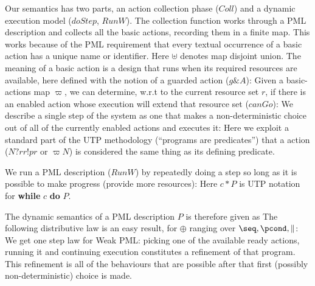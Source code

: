 Our semantics has two parts, an action collection phase ($Coll$)
and a dynamic execution model ($doStep$, $RunW$).
The collection function works through a PML description
and collects all the basic actions,
recording them in a finite map.
This works because of the PML requirement
that every textual occurrence
of a basic action has a unique name or identifier.
Here $\uplus$ denotes map disjoint union.
The meaning of a basic action is a design that runs when its
required resources are available,
here defined with the notion of a guarded action ($g\&A$):
Given a basic-actions map $\varpi$,
we can determine, w.r.t to the current resource set $r$,
if there is an enabled action whose execution will extend that
resource set ($canGo$):
We describe a single step of the system as one that
makes a non-deterministic choice out of all of the currently
enabled actions
and executes it:
Here we exploit a standard part of the UTP methodology
 (``programs are predicates'')
that a action ($N?rr!pr$ or $\varpi N$)
is considered the same thing as its defining predicate.

We run a PML description ($RunW$) by repeatedly doing a step
so long as it is possible to make progress (provide more resources):
Here $c * P$ is UTP notation for \textbf{while} $c$ \textbf{do} $P$.

The dynamic semantics of a PML description $P$ is therefore
given as
The following distributive law is an easy result,
for $\oplus$ ranging over $\seq,\pcond,\parallel$:
We get one step law for Weak PML:
picking one of the available ready actions, running it and
continuing execution
constitutes a refinement of that program.
This refinement is all of the behaviours that are possible
after that first (possibly non-deterministic) choice is made.

